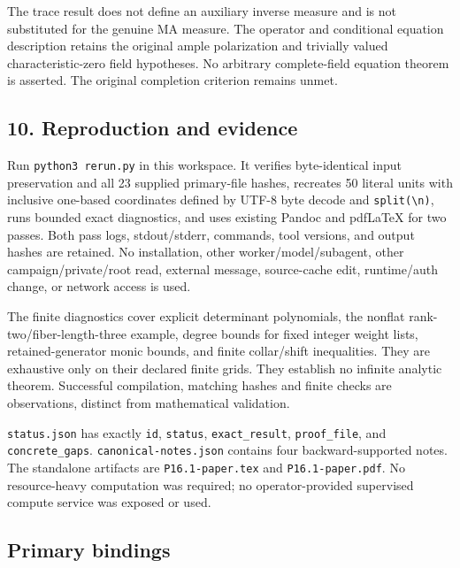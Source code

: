 \documentclass[
  10pt,
]{article}
\begin{document}
The trace result does not define an auxiliary inverse measure and is not
substituted for the genuine MA measure. The operator and conditional
equation description retains the original ample polarization and
trivially valued characteristic-zero field hypotheses. No arbitrary
complete-field equation theorem is asserted. The original completion
criterion remains unmet.

\subsection{10. Reproduction and
evidence}\label{reproduction-and-evidence}

Run \texttt{python3\ rerun.py} in this workspace. It verifies
byte-identical input preservation and all 23 supplied primary-file
hashes, recreates 50 literal units with inclusive one-based coordinates
defined by UTF-8 byte decode and
\texttt{split(\textquotesingle{}\textbackslash{}n\textquotesingle{})},
runs bounded exact diagnostics, and uses existing Pandoc and pdfLaTeX
for two passes. Both pass logs, stdout/stderr, commands, tool versions,
and output hashes are retained. No installation, other
worker/model/subagent, other campaign/private/root read, external
message, source-cache edit, runtime/auth change, or network access is
used.

The finite diagnostics cover explicit determinant polynomials, the
nonflat rank-two/fiber-length-three example, degree bounds for fixed
integer weight lists, retained-generator monic bounds, and finite
collar/shift inequalities. They are exhaustive only on their declared
finite grids. They establish no infinite analytic theorem. Successful
compilation, matching hashes and finite checks are observations,
distinct from mathematical validation.

\texttt{status.json} has exactly \texttt{id}, \texttt{status},
\texttt{exact\_result}, \texttt{proof\_file}, and
\texttt{concrete\_gaps}. \texttt{canonical-notes.json} contains four
backward-supported notes. The standalone artifacts are
\texttt{P16.1-paper.tex} and \texttt{P16.1-paper.pdf}. No resource-heavy
computation was required; no operator-provided supervised compute
service was exposed or used.

\subsection{Primary bindings}\label{primary-bindings}
\end{document}
